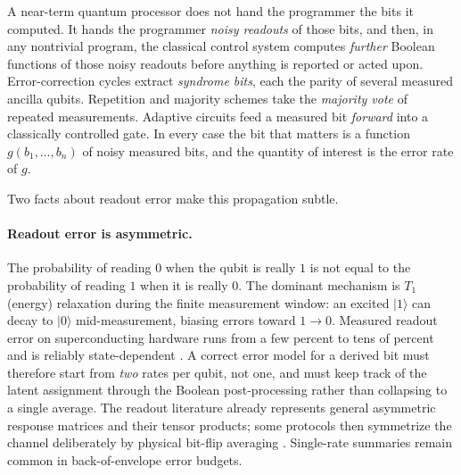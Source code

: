 \documentclass[11pt]{article}
\numberwithin{equation}{section}
\theoremstyle{plain}
\theoremstyle{definition}
\theoremstyle{remark}
\newcommand{\ket}[1]{\lvert #1 \rangle}
\begin{document}
A near-term quantum processor does not hand the programmer the bits it computed.
It hands the programmer \emph{noisy readouts} of those bits, and then, in any
nontrivial program, the classical control system computes \emph{further}
Boolean functions of those noisy readouts before anything is reported or acted
upon. Error-correction cycles extract \emph{syndrome bits}, each the parity of
several measured ancilla qubits. Repetition and majority schemes take the
\emph{majority vote} of repeated measurements. Adaptive circuits feed a measured
bit \emph{forward} into a classically controlled gate. In every case the bit
that matters is a function $g(b_1,\dots,b_n)$ of noisy measured bits, and the
quantity of interest is the error rate of $g$.

Two facts about readout error make this propagation subtle.

\paragraph{Readout error is asymmetric.} The probability of reading $0$ when the
qubit is really $1$ is not equal to the probability of reading $1$ when it is
really $0$. The dominant mechanism is $T_1$ (energy) relaxation during the finite
measurement window: an excited $\ket{1}$ can decay to $\ket{0}$ mid-measurement,
biasing errors toward $1\!\to\!0$. Measured readout error on superconducting
hardware runs from a few percent to tens of percent and is reliably
state-dependent \citep{tannu2019mitigating,hicks2021readout}. A correct error
model for a derived bit must therefore start from \emph{two} rates per qubit,
not one, and must keep track of the latent assignment through the Boolean
post-processing rather than collapsing to a single average. The readout
literature already represents general asymmetric response matrices and their
tensor products; some protocols then symmetrize the channel deliberately by
physical bit-flip averaging \citep{smith2021bitflip}. Single-rate summaries
remain common in back-of-envelope error budgets.
\end{document}
